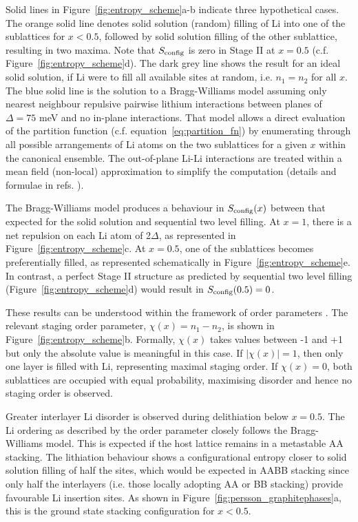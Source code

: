 \documentclass[../main.tex]{subfiles}
\begin{document}
Solid lines in Figure~\ref{fig:entropy_scheme}a-b indicate three hypothetical cases. The orange solid line denotes solid solution (random) filling of Li into one of the sublattices for $x<0.5$, followed by solid solution filling of the other sublattice, resulting in two maxima. Note that $S_{\rm{config}}$ is zero in Stage II at $x=0.5$ (c.f. Figure~\ref{fig:entropy_scheme}d). The dark grey line shows the result for an ideal solid solution, if Li were to fill all available sites at random, i.e. $n_{1} = n_{2}$ for all $x$. The blue solid line is the solution to a Bragg-Williams model \cite{Mercer2019,OTERO2017569} assuming only nearest neighbour repulsive pairwise lithium interactions between planes of $\Delta = 75$ meV and no in-plane interactions. That model allows a direct evaluation of the partition function (c.f. equation~\ref{eq:partition_fn}) by enumerating through all possible arrangements of Li atoms on the two sublattices for a given $x$ within the canonical ensemble. The out-of-plane Li-Li interactions are treated within a mean field (non-local) approximation to simplify the computation (details and formulae in refs. ).

The Bragg-Williams model produces a behaviour in $S_{\rm{config}}(x)$ between that expected for the solid solution and sequential two level filling. At $x=1$, there is a net repulsion on each Li atom of 2$\Delta$, as represented in Figure~\ref{fig:entropy_scheme}c. At $x = 0.5$, one of the sublattices becomes preferentially filled, as represented schematically in Figure~\ref{fig:entropy_scheme}e. In contrast, a perfect Stage II structure as predicted by sequential two level filling (Figure~\ref{fig:entropy_scheme}d) would result in $S_{\rm{config}}(0.5) = 0$. 

These results can be understood within the framework of order parameters \cite{natarajan2017}. The relevant staging order parameter, $\chi(x) = n_{1} - n_{2}$, is shown in Figure~\ref{fig:entropy_scheme}b.  Formally, $\chi(x)$ takes values between -1 and +1 but only the absolute value is meaningful in this case. If $|\chi(x)|=1$, then only one layer is filled with Li, representing maximal staging order. If $\chi(x)=0$, both sublattices are occupied with equal probability, maximising disorder and hence no staging order is observed.

Greater interlayer Li disorder is observed during delithiation below $x=0.5$. The Li ordering as described by the order parameter closely follows the Bragg-Williams model. This is expected if the host lattice remains in a metastable AA stacking. The lithiation behaviour shows a configurational entropy closer to solid solution filling of half the sites, which would be expected in AABB stacking since only half the interlayers (i.e. those locally adopting AA or BB stacking) provide favourable Li insertion sites. As shown in Figure~\ref{fig:persson_graphitephases}a, this is the ground state stacking configuration for $x<0.5$.  
\end{document}
